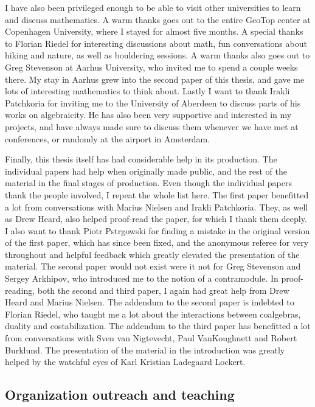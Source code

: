 I have also been privileged enough to be able to visit other universities to learn and discuss mathematics. A warm thanks goes out to the entire GeoTop center at Copenhagen University, where I stayed for almost five months. A special thanks to Florian Riedel for interesting discussions about math, fun conversations about hiking and nature, as well as bouldering sessions. A warm thanks also goes out to Greg Stevenson at Aarhus University, who invited me to spend a couple weeks there. My stay in Aarhus grew into the second paper of this thesis, and gave me lots of interesting mathematics to think about. Lastly I want to thank Irakli Patchkoria for inviting me to the University of Aberdeen to discuss parts of his works on algebraicity. He has also been very supportive and interested in my projects, and have always made sure to discuss them whenever we have met at conferences, or randomly at the airport in Amsterdam. 

Finally, this thesis itself has had considerable help in its production. The individual papers had help when originally made public, and the rest of the material in the final stages of production. Even though the individual papers thank the people involved, I repeat the whole list here. The first paper benefitted a lot from conversations with Marius Nielsen and Irakli Patchkoria. They, as well as Drew Heard, also helped proof-read the paper, for which I thank them deeply. I also want to thank Piotr Pstr\a{}gowski for finding a mistake in the original version of the first paper, which has since been fixed, and the anonymous referee for very throughout and helpful feedback which greatly elevated the presentation of the material. The second paper would not exist were it not for Greg Stevenson and Sergey Arkhipov, who introduced me to the notion of a contramodule. In proof-reading, both the second and third paper, I again had great help from Drew Heard and Marius Nielsen. The addendum to the second paper is indebted to Florian Riedel, who taught me a lot about the interactions between coalgebras, duality and costabilization. The addendum to the third paper has benefitted a lot from conversations with Sven van Nigtevecht, Paul VanKoughnett and Robert Burklund. The presentation of the material in the introduction was greatly helped by the watchful eyes of Karl Kristian Ladegaard Lockert. 


\subsection*{Organization outreach and teaching}

